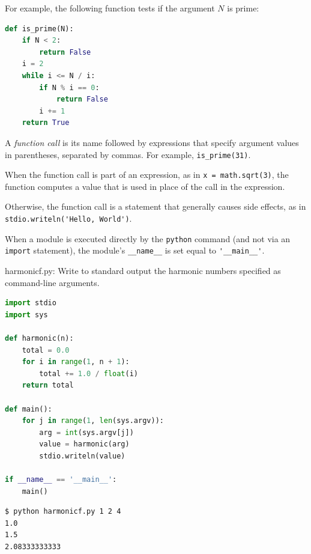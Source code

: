 \documentclass[8pt,a4paper,compress,handout]{beamer}
\begin{document}
\begin{frame}[fragile]
For example, the following function tests if the argument $N$ is prime:

\begin{lstlisting}[language=Python]
def is_prime(N):
    if N < 2: 
        return False
    i = 2
    while i <= N / i:
        if N % i == 0:
            return False
        i += 1
    return True
\end{lstlisting}

\bigskip

A \emph{function call} is its name followed by expressions that specify argument values in parentheses, separated by commas. For example, \lstinline{is_prime(31)}.

\bigskip

When the function call is part of an expression, as in \lstinline{x = math.sqrt(3)}, the function computes a value that is used in place of the call in the expression. 

\bigskip

Otherwise, the function call is a statement that generally causes side effects, as in \lstinline{stdio.writeln('Hello, World')}.

\bigskip

When a module is executed directly by the \lstinline{python} command (and not via an \lstinline{import} statement), the module's \lstinline{__name__} is set equal to \lstinline{'__main__'}.
\end{frame}

\begin{frame}[fragile]
\begin{framed}
\tiny harmonicf.py:  Write to standard output the harmonic numbers specified as command-line arguments.
\end{framed}

\begin{lstlisting}[language=Python]
import stdio
import sys

def harmonic(n):
    total = 0.0
    for i in range(1, n + 1):
        total += 1.0 / float(i)
    return total

def main():
    for j in range(1, len(sys.argv)):
        arg = int(sys.argv[j])
        value = harmonic(arg)
        stdio.writeln(value)

if __name__ == '__main__':
    main()
\end{lstlisting}

\begin{lstlisting}[language={}]
$ python harmonicf.py 1 2 4
1.0
1.5
2.08333333333
\end{lstlisting}
\end{frame}
\end{document}
